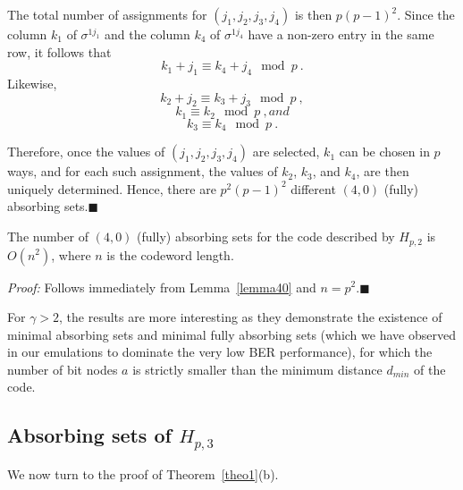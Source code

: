 The total number of assignments for $(j_1,j_2,j_3,j_4)$ is then
$p(p-1)^2$. Since the column $k_1$ of $\sigma^{1j_1}$ and the
column $k_4$ of $\sigma^{1j_4}$ have a non-zero entry in the same
row, it follows that
\begin{equation}
k_1+j_1 \equiv k_4+j_4 \mod p~.
\end{equation}
Likewise,
\begin{equation}
k_2+j_2 \equiv k_3+j_3 \mod p~,
\end{equation}
\begin{equation}
k_1 \equiv k_2 \mod p~, and
\end{equation}
\begin{equation}
k_3 \equiv k_4\mod p~.
\end{equation}

Therefore, once the values of  $(j_1,j_2,j_3,j_4)$ are selected,
$k_1$ can be chosen in $p$ ways, and for each such assignment, the
values of $k_2$, $k_3$, and $k_4$, are then uniquely determined.
Hence, there are $p^2(p-1)^2$ different $(4,0)$ (fully) absorbing
sets.\hfill$\blacksquare$

\begin{corollary} The number of $(4,0)$ (fully) absorbing sets for
the code described by $H_{p,2}$ is $O(n^{2})$, where $n$ is the
codeword length.
\end{corollary}
\noindent \textit{Proof:} Follows immediately from
Lemma~\ref{lemma40} and $n=p^2$.\hfill$\blacksquare$

 For $\gamma
> 2$, the results are more interesting as they demonstrate the
existence of minimal absorbing sets and minimal fully absorbing
sets (which we have observed in our emulations to dominate the
very low BER performance), for which the number of bit nodes $a$
is strictly smaller than the minimum distance $d_{min}$ of the
code.


\subsection{Absorbing sets of
$H_{p,3}$}\label{theo13}


We now turn to the proof of Theorem~\ref{theo1}(b).


